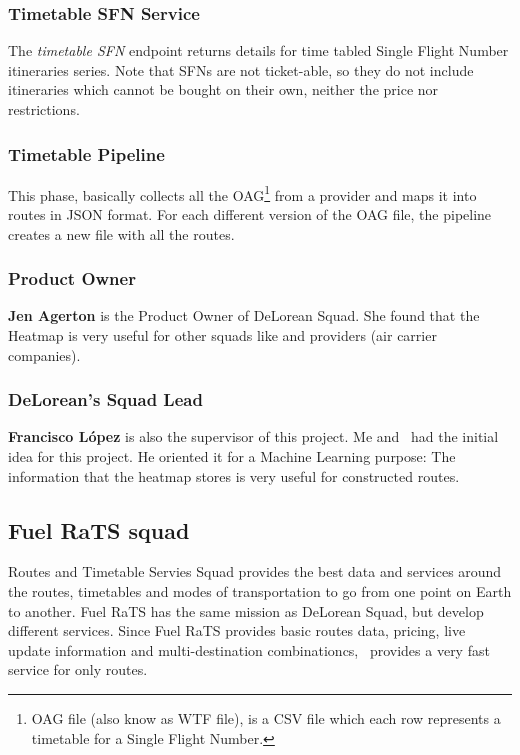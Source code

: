 \subsubsection{Timetable SFN Service} \label{timetable_sfn_service}

The \textit{timetable SFN} endpoint returns details for time tabled Single Flight Number itineraries series. Note that SFNs are not ticket-able, so they do not include itineraries which cannot be bought on their own, neither the price nor restrictions.

\subsubsection{Timetable Pipeline} \label{timetable_pipeline}

This phase, basically collects all the OAG\footnote{OAG file (also know as WTF file), is a CSV\cite{csv} file which each row represents a timetable for a Single Flight Number.} from a provider and maps it into routes in JSON\cite{json} format. For each different version of the OAG file, the pipeline creates a new file with all the routes.

\subsubsection{Product Owner} \label{product_owner}

\textbf{Jen Agerton} is the Product Owner of DeLorean Squad. She found that the Heatmap is very useful for other squads like  and providers (air carrier companies).

\subsubsection{DeLorean's Squad Lead}

\textbf{Francisco López} is also the supervisor of this project. Me and \supervisor\ had the initial idea for this project. He oriented it for a Machine Learning purpose: The information that the heatmap stores is very useful for constructed routes.

\subsection{Fuel RaTS squad}

Routes and Timetable Servies Squad provides the best data and services around the routes, timetables and modes of transportation to go from one point on Earth to another. Fuel RaTS has the same mission as DeLorean Squad, but develop different services. Since Fuel RaTS provides basic routes data, pricing, live update information and multi-destination combinationcs, \squad\ provides a very fast service for only routes.

